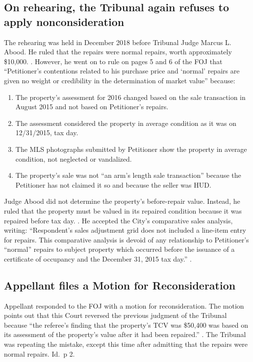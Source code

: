 \documentclass[12pt,\documentclassflag]{michiganCourtOfAppealsBrief}
\begin{document}
\subsection{On rehearing, the Tribunal again refuses to apply nonconsideration}

The rehearing was held in December 2018 before Tribunal Judge Marcus L. Abood. He ruled that the repairs were normal repairs, worth approximately \$10,000. \foj[4]. However, he went on to rule on pages 5 and 6 of the FOJ that ``Petitioner's contentions related to his purchase price and `normal' repairs are given no weight or credibility in the determination of market value'' because:
\begin{enumerate}
\item The property's assessment for 2016 changed based on the sale transaction in August 2015 and not based on Petitioner's repairs. 
\item The assessment considered the property in average condition as it was on 12/31/2015, tax day.
\item The MLS photographs submitted by Petitioner show the property in average condition, not neglected or vandalized.
\item The property's sale was not ``an arm's length sale transaction'' because the Petitioner has not claimed it so and because the seller was HUD.
\end{enumerate}

Judge Abood did not determine the property's before-repair value. Instead, he ruled that the property must be valued in its repaired condition because it was repaired before tax day. \foj[5]. He accepted the City's comparative sales analysis, writing: ``Respondent's sales adjustment grid does not included a line-item entry for repairs. This comparative analysis is devoid of any relationship to Petitioner's ``normal'' repairs to subject property which occurred before the issuance of a certificate of occupancy and the December 31, 2015 tax day.'' \foj[6].

\subsection{Appellant files a Motion for Reconsideration}

Appellant responded to the FOJ with a motion for reconsideration. The motion points out that this Court reversed the previous judgment of the Tribunal because  ``the referee's finding that the property's TCV was \$50,400 was based on its assessment of the property's value after it had been repaired.'' \motionForReconsideration[1]. The Tribunal was repeating the mistake, except this time after admitting that the repairs were normal repairs. Id.\ p 2. 
\end{document}
